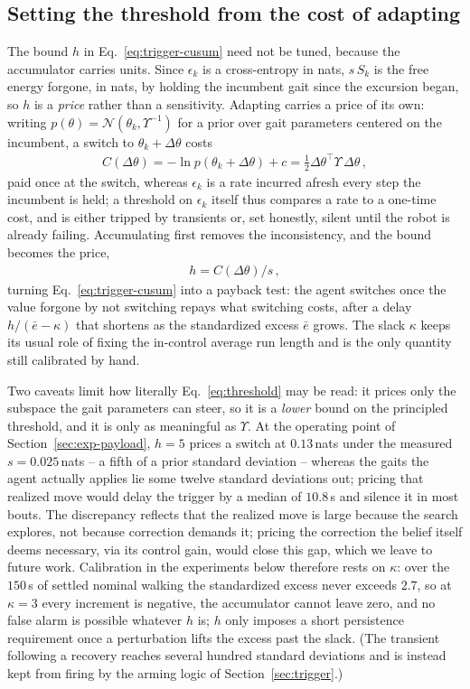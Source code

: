 \documentclass[letterpaper, 10 pt, conference]{ieeeconf}  %
\newcommand{\cN}{\mathcal{N}}
\begin{document}
\subsection{Setting the threshold from the cost of adapting}
\label{sec:threshold}

The bound $h$ in Eq.~\ref{eq:trigger-cusum} need not be tuned, because the accumulator carries units.
Since $\epsilon_k$ is a cross-entropy in nats, $s\,S_k$ is the free energy forgone, in nats, by holding the incumbent gait since the excursion began, so $h$ is a \emph{price} rather than a sensitivity.
Adapting carries a price of its own: writing $p(\theta) = \cN(\theta_k, \Upsilon^{-1})$ for a prior over gait parameters centered on the incumbent, a switch to $\theta_k + \Delta\theta$ costs
\begin{align} \label{eq:switch-cost}
    C(\Delta\theta) = -\ln p(\theta_k + \Delta\theta) + c = \tfrac{1}{2}\Delta\theta^{\top}\Upsilon\,\Delta\theta \,,
\end{align}
paid once at the switch, whereas $\epsilon_k$ is a rate incurred afresh every step the incumbent is held; a threshold on $\epsilon_k$ itself thus compares a rate to a one-time cost, and is either tripped by transients or, set honestly, silent until the robot is already failing.
Accumulating first removes the inconsistency, and the bound becomes the price,
\begin{align} \label{eq:threshold}
    h = C(\Delta\theta)/s \,,
\end{align}
turning Eq.~\ref{eq:trigger-cusum} into a payback test: the agent switches once the value forgone by not switching repays what switching costs, after a delay $h/(\bar{e}-\kappa)$ that shortens as the standardized excess $\bar{e}$ grows.
The slack $\kappa$ keeps its usual role of fixing the in-control average run length and is the only quantity still calibrated by hand.

Two caveats limit how literally Eq.~\ref{eq:threshold} may be read: it prices only the subspace the gait parameters can steer, so it is a \emph{lower} bound on the principled threshold, and it is only as meaningful as $\Upsilon$.
At the operating point of Section~\ref{sec:exp-payload}, $h=5$ prices a switch at $0.13$\,nats under the measured $s = 0.025$\,nats -- a fifth of a prior standard deviation -- whereas the gaits the agent actually applies lie some twelve standard deviations out; pricing that realized move would delay the trigger by a median of $10.8$\,s and silence it in most bouts.
The discrepancy reflects that the realized move is large because the search explores, not because correction demands it; pricing the correction the belief itself deems necessary, via its control gain, would close this gap, which we leave to future work.
Calibration in the experiments below therefore rests on $\kappa$: over the $150$\,s of settled nominal walking the standardized excess never exceeds $2.7$, so at $\kappa = 3$ every increment is negative, the accumulator cannot leave zero, and no false alarm is possible whatever $h$ is; $h$ only imposes a short persistence requirement once a perturbation lifts the excess past the slack.
(The transient following a recovery reaches several hundred standard deviations and is instead kept from firing by the arming logic of Section~\ref{sec:trigger}.)
\end{document}
